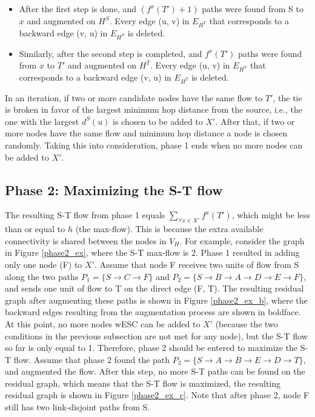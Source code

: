 \documentclass[conference]{IEEEtran}
\begin{document}
\begin{itemize}
\item After the first step is done, and  $(f^x(T') + 1)$ paths were found from S to $x$ and augmented on $H^S$. Every edge (u, v) in $E_{H^T}$ that corresponds to a backward edge (v, u) in $E_{H^S}$ is deleted.   
\item Similarly, after the second step is completed, and  $f^x(T')$ paths were found from $x$ to $T'$ and augmented on $H^T$. Every edge (u, v) in $E_{H^S}$ that corresponds to a backward edge (v, u) in $E_{H^T}$ is deleted.   
\end{itemize}

In an iteration, if two or more candidate nodes have the same flow to $T'$, the tie is broken in favor of the largest minimum hop distance from the source, i.e., the one with the largest $d^S(u)$ is chosen to be added to $X'$. After that, if two or more nodes have the same flow and minimum hop distance a node is chosen randomly. Taking this into consideration, phase 1 ends when no more nodes can be added to $X'$. 




\subsection{Phase 2: Maximizing the S-T flow}

The resulting S-T flow from phase 1 equals $\sum_{\forall x \in X'} f^x(T')$, which might be less than or equal to $h$ (the max-flow). This is because the extra available connectivity is shared between the nodes in $V_H$. For example, consider the graph in Figure \ref{phase2_ex}, where the S-T max-flow is 2. Phase 1 resulted in adding only one node (F) to $X'$. Assume that node F receives two units of flow from S along the two paths $P_1 = \{S \rightarrow C \rightarrow F\}$ and $P_2 = \{S \rightarrow B \rightarrow A \rightarrow D \rightarrow E \rightarrow F\}$, and sends one unit of flow to T on the direct edge (F, T). The resulting residual graph after augmenting these paths is shown in Figure \ref{phase2_ex_b}, where the backward edges resulting from the augmentation process are shown in boldface. At this point, no more nodes wESC can be added to $X'$ (because the two conditions in the previous subsection are not met for any node), but the S-T flow so far is only equal to 1. Therefore, phase 2 should be entered to maximize the S-T flow. Assume that phase 2 found the path $P_3 = \{S \rightarrow A \rightarrow B \rightarrow E \rightarrow D \rightarrow T\}$, and augmented the flow. After this step, no more S-T paths can be found on the residual graph, which means that the S-T flow is maximized, the resulting residual graph is shown in Figure \ref{phase2_ex_c}. Note that after phase 2, node F still has two link-disjoint paths from S.
\end{document}
